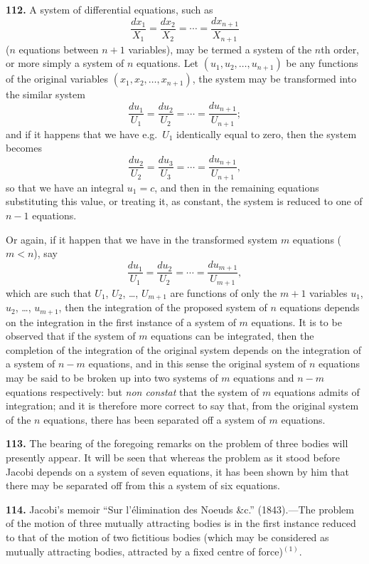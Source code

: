 \documentclass[11pt,a4paper]{book}
\begin{document}
\medskip

\textbf{112.} A system of differential equations, such as
\[
\frac{dx_1}{X_1} = \frac{dx_2}{X_2} = \cdots = \frac{dx_{n+1}}{X_{n+1}}
\]
($n$ equations between $n+1$ variables), may be termed a system of the $n$th order, or more simply a system of $n$ equations. Let $(u_1, u_2, \dots, u_{n+1})$ be any functions of the original variables $(x_1, x_2, \dots, x_{n+1})$, the system may be transformed into the similar system
\[
\frac{du_1}{U_1} = \frac{du_2}{U_2} = \cdots = \frac{du_{n+1}}{U_{n+1}};
\]
and if it happens that we have e.g.\ $U_1$ identically equal to zero, then the system becomes
\[
\frac{du_2}{U_2} = \frac{du_3}{U_3} = \cdots = \frac{du_{n+1}}{U_{n+1}},
\]
so that we have an integral $u_1 = c$, and then in the remaining equations substituting this value, or treating it, as constant, the system is reduced to one of $n-1$ equations.

Or again, if it happen that we have in the transformed system $m$ equations ($m < n$), say
\[
\frac{du_1}{U_1} = \frac{du_2}{U_2} = \cdots = \frac{du_{m+1}}{U_{m+1}},
\]
which are such that $U_1$, $U_2$, \dots, $U_{m+1}$ are functions of only the $m+1$ variables $u_1$, $u_2$, \dots, $u_{m+1}$, then the integration of the proposed system of $n$ equations depends on the integration in the first instance of a system of $m$ equations. It is to be observed that if the system of $m$ equations can be integrated, then the completion of the integration of the original system depends on the integration of a system of $n - m$ equations, and in this sense the original system of $n$ equations may be said to be broken up into two systems of $m$ equations and $n-m$ equations respectively: but \textit{non constat} that the system of $m$ equations admits of integration; and it is therefore more correct to say that, from the original system of the $n$ equations, there has been separated off a system of $m$ equations.

\textbf{113.} The bearing of the foregoing remarks on the problem of three bodies will presently appear. It will be seen that whereas the problem as it stood before Jacobi depends on a system of seven equations, it has been shown by him that there may be separated off from this a system of six equations.

\textbf{114.} Jacobi's memoir ``Sur l'\'elimination des Noeuds \&c.'' (1843).---The problem of the motion of three mutually attracting bodies is in the first instance reduced to that of the motion of two fictitious bodies (which may be considered as mutually attracting bodies, attracted by a fixed centre of force)$^{(1)}$.
\end{document}

